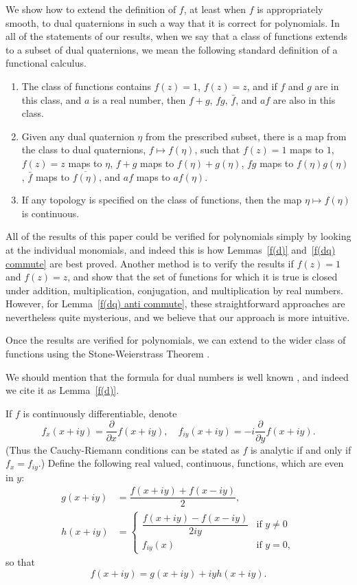 \documentclass[12pt,reqno]{amsart}
\begin{document}
We show how to extend the definition of $f$, at least when $f$ is appropriately smooth, to dual quaternions in such a way that it is correct for polynomials.  In all of the statements of our results, when we say that a class of functions extends to a subset of dual quaternions, we mean the following standard definition of a functional calculus.
\begin{enumerate}
\item The class of functions contains $f(z) = 1$, $f(z) = z$, and if $f$ and $g$ are in this class, and $a$ is a real number, then $f+g$, $fg$, $\bar f$, and $a f$ are also in this class.
\item Given any dual quaternion $\eta$ from the prescribed subset, there is a map from the class to dual quaternions, $f \mapsto f(\eta)$, such that $f(z) = 1$ maps to $1$, $f(z) = z$ maps to $\eta$, $f+g$ maps to $f(\eta) + g(\eta)$, $fg$ maps to $f(\eta) g(\eta)$, $\bar f$ maps to $\overline{f(\eta)}$, and $a f$ maps to $a f(\eta)$.
\item If any topology is specified on the class of functions, then the map $\eta \mapsto f(\eta)$ is continuous.
\end{enumerate}
All of the results of this paper could be verified for polynomials simply by looking at the individual monomials, and indeed this is how Lemmas~\ref{f(d)} and~\ref{f(dq) commute} are best proved.  Another method is to verify the results if $f(z) = 1$ and $f(z) = z$, and show that the set of functions for which it is true is closed under addition, multiplication, conjugation, and multiplication by real numbers.  However, for Lemma~\ref{f(dq) anti commute}, these straightforward approaches are nevertheless quite mysterious, and we believe that our approach is more intuitive.

Once the results are verified for polynomials, we can extend to the wider class of functions using the Stone-Weierstrass Theorem \cite{rudin}.

We should mention that the formula for dual numbers is well known \cite{wiki-1}, and indeed we cite it as Lemma~\ref{f(d)}.

If $f$ is continuously differentiable, denote
\begin{equation}
f_x(x+iy) = \dfrac{\partial}{\partial x} f(x+iy) , \quad
f_{iy}(x+iy) = -i\dfrac{\partial}{\partial y} f(x+iy) .
\end{equation}
(Thus the Cauchy-Riemann conditions can be stated as $f$ is analytic if and only if $f_x = f_{iy}$.)  Define the following real valued, continuous, functions, which are even in $y$:
\begin{align}
\label{g}
g(x+iy) &= \dfrac{f(x+iy) + f(x-iy)} 2, \\
\label{h}
h(x+iy) &= \begin{cases}
\dfrac{f(x+iy)-f(x-iy)}{2iy} &\text{if $y \ne 0$} \\
f_{iy} (x) &\text{if $y = 0$} ,
\end{cases}
\end{align}
so that
\begin{equation}
f(x+iy) = g(x+iy) + i y h(x+iy) .
\end{equation}
\end{document}
